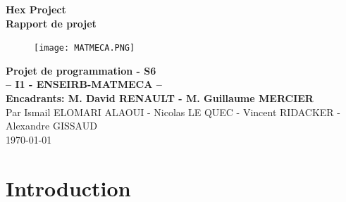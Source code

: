 \documentclass{article}
\begin{document}
\begin {titlepage}
  \begin{center}
      \vspace*{1cm}
    \Large{\textbf{Hex Project}}\\
    \Large{\textbf{Rapport de projet}}
    \vfill
    \begin{figure}[h]
        \centering
        \texttt{[image: MATMECA.PNG]}
    \end{figure}
    \vfill    
    
    \huge{\textbf{Projet de programmation - S6}}\\[3mm]
    \Large{\textbf{-- I1 - ENSEIRB-MATMECA --}}\\[1mm]
    \Large{\textbf{Encadrants: M. David RENAULT - M. Guillaume MERCIER }}\\[1mm]    
    \vfill
    Par Ismail ELOMARI ALAOUI - Nicolas LE QUEC - Vincent RIDACKER - Alexandre GISSAUD\\
    \today\\
  \end{center}
\end{titlepage}

 \tableofcontents
\clearpage
\newpage

\section*{Introduction}
\end{document}
